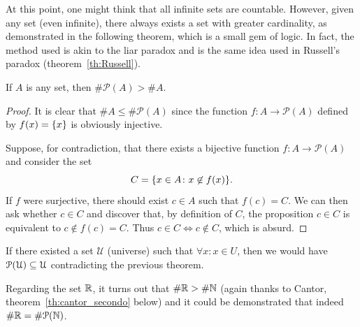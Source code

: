 At this point, one might think that
all infinite sets are countable.
However, given any set (even infinite),
there always exists a set with greater cardinality,
as demonstrated in the following theorem, which is a small gem of logic.
In fact, the method used is akin to the liar paradox 
and is the same idea used in Russell's paradox (theorem~\ref{th:Russell}).
%
%
\begin{theorem}[Cantor]%
%
%
\label{th:Cantor}%
  If $A$ is any set, then $\# \mathcal P(A) > \# A$.
\end{theorem}
%
\begin{proof}
  It is clear that $\# A \le \#\mathcal P(A)$ since 
  the function $f\colon A \to \mathcal P(A)$ defined by $f(x)=\ENCLOSE{x}$
  is obviously injective.

    Suppose, for contradiction, that there exists a bijective function $f\colon
  A\to \mathcal P(A)$
  and consider the set 
  \[
    C = \ENCLOSE{x\in A \colon x\not\in f(x)}.  
  \]
  If $f$ were surjective, there should exist $c\in A$ such that $f(c) = C$.
  We can then ask whether $c\in C$ and discover that, 
  by definition of $C$, the proposition $c\in C$ is equivalent 
  to $c\not\in f(c) = C$. 
  Thus $c\in C \iff c\not\in C$, which is absurd.
\end{proof}
%
\begin{corollary}
  If there existed a set $\mathcal U$ (universe) 
  such that $\forall x\colon x \in U$, then 
  we would have $\mathcal \P(\mathcal U) \subset \mathcal U$
  contradicting the previous theorem.
\end{corollary}
%
Regarding the set $\RR$, it
turns out that $\#\RR > \#\NN$
(again thanks to Cantor, theorem~\ref{th:cantor_secondo} below)
and it could be demonstrated that indeed $\#\RR = \#\mathcal P(\NN)$.

